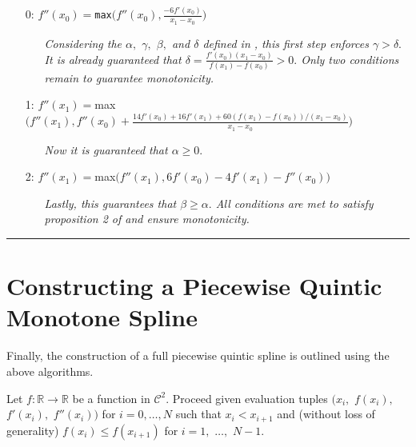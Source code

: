 \documentclass{article}
\begin{document}
\begin{itemize}
  \itemsep0pt
  \parskip0pt

\item[0:] $f''(x_0) = $\texttt{max}$\bigg(f''(x_0), \frac{-6 f'(x_0)}{x_1 - x_0}\bigg)$

  \begin{itemize}
    \item[] \textit{Considering the $\alpha,$ $\gamma,$ $\beta,$ and $\delta$ defined in \cite{schmidt1988positivity}, this first step enforces $\gamma > \delta.$ It is already guaranteed that $\delta = \frac{f'(x_0)(x_1 - x_0)}{f(x_1) - f(x_0)} > 0.$ Only two conditions remain to guarantee monotonicity.}
  \end{itemize}

\item[1:] $f''(x_1) = $max$\bigg( f''(x_1), f''(x_0) + \frac{14 f'(x_0) + 16 f'(x_1) + 60(f(x_1) - f(x_0)) / (x_1 - x_0)}{x_1 - x_0} \bigg)$

  \begin{itemize}
    \item[] \textit{Now it is guaranteed that $\alpha \geq 0.$}
  \end{itemize}

\item[2:] $f''(x_1) = $max$\bigg( f''(x_1), 6 f'(x_0) - 4 f'(x_1) - f''(x_0) \bigg)$

  \begin{itemize}
    \item[] \textit{Lastly, this guarantees that $\beta \geq \alpha.$ All conditions are met to satisfy proposition 2 of \cite{schmidt1988positivity} and ensure monotonicity.}
  \end{itemize}
\end{itemize}
\hrule
\vspace{10pt}



\section{Constructing a Piecewise Quintic Monotone Spline}
\label{monotone_spline}

Finally, the construction of a full piecewise quintic spline is outlined using the above algorithms.

Let $f: \mathbb{R} \rightarrow \mathbb{R}$ be a function in $\mathcal{C}^2.$ Proceed given evaluation tuples $\big(x_i,$ $f(x_i),$ $f'(x_i),$ $f''(x_i)\big)$ for $i = 0,\ldots,N$ such that $x_i < x_{i+1}$ and (without loss of generality) $f(x_i) \leq f(x_{i+1})$ for $i = 1,$ $\ldots,$ $N-1$. 
\end{document}
